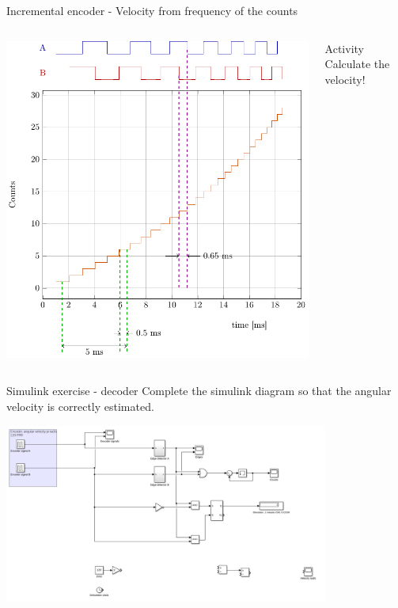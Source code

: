 \documentclass[presentation,aspectratio=169]{beamer}
\begin{document}
\begin{frame}[label={sec:org7d3f8ed}]{Incremental encoder - Velocity from frequency of the counts}
\begin{columns}
\begin{column}{0.5\columnwidth}
\begin{center}
\includegraphics[width=\textwidth]{../../figures/encoder-signals-nonuniform}
\end{center}
\end{column}
\begin{column}{0.5\columnwidth}
\alert{Activity} Calculate the velocity!
\end{column}
\end{columns}
\end{frame}






\begin{frame}[label={sec:orgd750b5c}]{Simulink exercise - decoder}
Complete the simulink diagram so that the angular velocity is correctly estimated.

\begin{center}
\includegraphics[width=0.8\textwidth]{../../figures/simulink-encoder-decoder-exc.png}
\end{center}
\end{frame}
\end{document}

